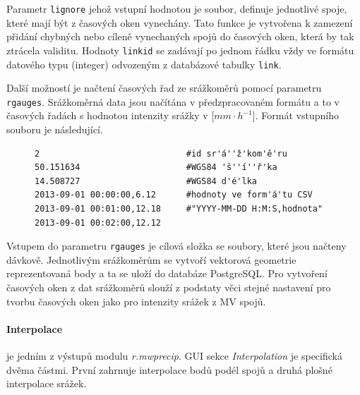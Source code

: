 \documentclass[a4paper,12pt,oneside]{report}
\begin{document}
Parametr \texttt{lignore} jehož vstupní hodnotou je soubor, definuje jednotlivé spoje, které mají být z časových oken vynechány. Tato funkce je vytvořena k zamezení přidání chybných nebo cíleně vynechaných spojů do časových oken, která by tak ztrácela validitu. Hodnoty \texttt{linkid} se zadávají po jednom řádku vždy ve formátu datového typu (integer) odvozeným z databázové tabulky \texttt{link}.

Další možností je načtení časových řad ze srážkoměrů pomocí parametru \texttt{rgauges}. Srážkoměrná data jsou načítána v předzpracovaném formátu a to v časových řadách s hodnotou intenzity srážky v [$mm \cdot h^{-1}$]. Formát vstupního souboru je následující.


\begin{figure}[h!]
\begin{footnotesize}
\lstset{extendedchars=false,
escapeinside=''}
\begin{lstlisting}[style=mybash]
2                             #id sr'á''ž'kom'ě'ru			
50.151634                     #WGS84 'š''í''ř'ka				
14.508727                     #WGS84 d'é'lka	
2013-09-01 00:00:00,6.12      #hodnoty ve form'á'tu CSV 
2013-09-01 00:01:00,12.18     #"YYYY-MM-DD H:M:S,hodnota"		
2013-09-01 00:02:00,12.12
\end{lstlisting}
\end{footnotesize}
\end{figure}


Vstupem do parametru \texttt{rgauges} je cílová složka se soubory, které jsou načteny dávkově. Jednotlivým srážkoměrům se vytvoří vektorová geometrie reprezentovaná body a ta se uloží do databáze PostgreSQL. Pro vytvoření časových oken z dat srážkoměrů slouží z podstaty věci stejné nastavení pro tvorbu časových oken jako pro intenzity srážek z MV spojů.


\paragraph*{Interpolace} je jedním z výstupů modulu \textit{r.mwprecip}. GUI sekce \textit{Interpolation} je specifická dvěma částmi. První zahrnuje interpolace bodů podél spojů a druhá plošné interpolace srážek.
\end{document}
